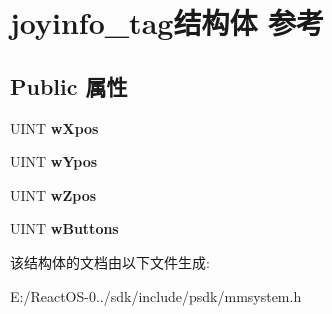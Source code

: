 \hypertarget{structjoyinfo__tag}{}\section{joyinfo\+\_\+tag结构体 参考}
\label{structjoyinfo__tag}
\subsection*{Public 属性}
\begin{DoxyCompactItemize}
\item 
\mbox{\label{structjoyinfo__tag_a1e3f82c0df47a765fe2ce5da3e971a3e}} 
U\+I\+NT {\bfseries w\+Xpos}
\item 
\mbox{\label{structjoyinfo__tag_a36175e9bc5d9669ca4412ac53f92d067}} 
U\+I\+NT {\bfseries w\+Ypos}
\item 
\mbox{\label{structjoyinfo__tag_ab4c7d0dc9ef9b918236fe42dbac19320}} 
U\+I\+NT {\bfseries w\+Zpos}
\item 
\mbox{\label{structjoyinfo__tag_a5d55fd05f58f1e0c461aba9a7bcbd00f}} 
U\+I\+NT {\bfseries w\+Buttons}
\end{DoxyCompactItemize}


该结构体的文档由以下文件生成\+:\begin{DoxyCompactItemize}
\item 
E\+:/\+React\+O\+S-\/0../sdk/include/psdk/mmsystem.\+h\end{DoxyCompactItemize}
